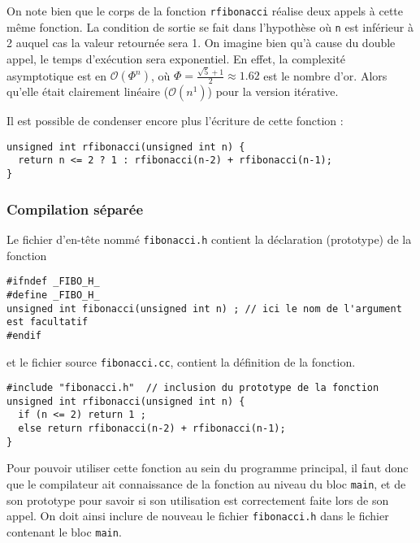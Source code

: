 \documentclass{book}
\begin{document}
\begin{correction}
On note bien que le corps de la fonction \texttt{rfibonacci} réalise deux appels à cette
même fonction. La condition de sortie se fait dans l'hypothèse où \texttt{n} est
inférieur à 2 auquel cas la valeur retournée sera 1. On imagine bien qu'à cause du double appel, le temps d'exécution sera exponentiel. En effet, la complexité asymptotique est en $\mathcal{O}(\Phi^n)$, où $\Phi=\frac{\sqrt{5}+1}{2}\approx 1.62$ est le nombre d'or. Alors qu'elle était clairement linéaire ($\mathcal{O}(n^1)$) pour la version itérative.

Il est possible de condenser encore plus l'écriture de cette fonction :

\begin{verbatim}
unsigned int rfibonacci(unsigned int n) {
  return n <= 2 ? 1 : rfibonacci(n-2) + rfibonacci(n-1);
}
\end{verbatim}

\subsubsection{Compilation séparée}


Le fichier d'en-tête nommé \texttt{fibonacci.h} contient la déclaration (prototype) de la fonction

\begin{verbatim}
#ifndef _FIBO_H_
#define _FIBO_H_
unsigned int fibonacci(unsigned int n) ; // ici le nom de l'argument est facultatif
#endif
\end{verbatim}

et le fichier source \texttt{fibonacci.cc}, contient la définition de la fonction.

\begin{verbatim}
#include "fibonacci.h"  // inclusion du prototype de la fonction
unsigned int rfibonacci(unsigned int n) {
  if (n <= 2) return 1 ;
  else return rfibonacci(n-2) + rfibonacci(n-1);
}
\end{verbatim}

Pour pouvoir utiliser cette fonction au sein du programme principal, il faut
donc que le compilateur ait connaissance de la fonction au niveau du bloc \texttt{main}, et de son prototype pour savoir si son utilisation est correctement faite lors de son appel. On doit ainsi inclure de nouveau le fichier \texttt{fibonacci.h}
dans le fichier contenant le bloc \texttt{main}.


\end{correction}
\end{document}
